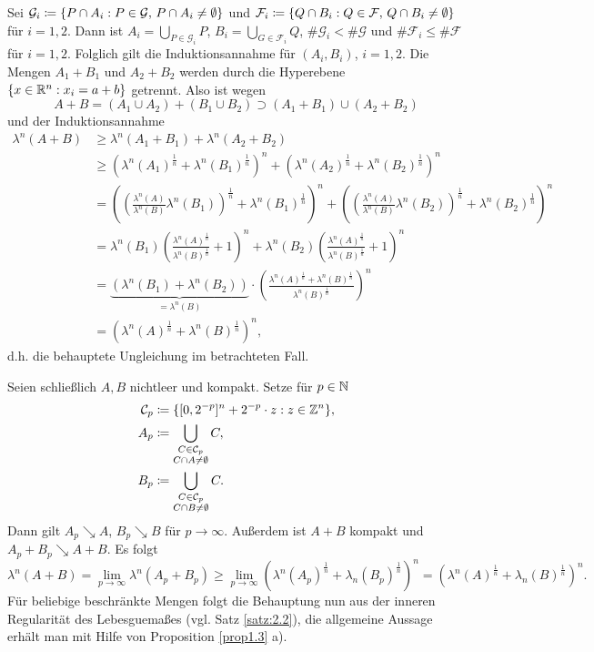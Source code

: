 \documentclass[a4paper,twoside,DIV15,BCOR12mm]{scrbook}
\newcommand{\downto}{\mathrel\searrow}
\begin{document}
\begin{beweis}
Sei $\mathcal G_i \da \{P \cap A_i: P\in\mathcal G,\, P\cap A_i\ne \emptyset\}$ und $\mathcal F_i \da \{Q \cap B_i: Q\in\mathcal F,\, Q\cap B_i\ne \emptyset\}$ für $i=1,2$. Dann ist $A_i = \bigcup_{P\in \mathcal G_i}P$, $B_i = \bigcup_{G\in \mathcal F_i}Q$, $\#\mathcal G_i < \#\mathcal G$ und $\#\mathcal F_i \le \#\mathcal F$ für $i=1,2$. Folglich gilt die Induktionsannahme für $(A_i,B_i)$, $i=1,2$. Die Mengen $A_1 + B_1$ und $A_2+B_2$ werden durch die Hyperebene $\{x\in\mathbb{R}^n: x_i = a+b\}$ getrennt. Also ist wegen
\[
A+B = (A_1\cup A_2) + (B_1\cup B_2) \supset (A_1 + B_1) \cup (A_2 + B_2)
\]
und der Induktionsannahme
\begin{align*}
\lambda^n(A+B)
&\ge \lambda^n(A_1+B_1) + \lambda^n(A_2+B_2) \\
&\ge \left(\lambda^n(A_1)^{\frac 1n} + \lambda^n(B_1)^{\frac 1n}\right)^n + \left(\lambda^n(A_2)^{\frac 1n} + \lambda^n(B_2)^{\frac 1n}\right)^n \\
&= \left(\left(\frac{\lambda^n(A)}{\lambda^n(B)}\lambda^n(B_1)\right)^{\frac 1n} + \lambda^n(B_1)^{\frac 1n}\right)^n + \left(\left(\frac{\lambda^n(A)}{\lambda^n(B)}\lambda^n(B_2)\right)^{\frac 1n} + \lambda^n(B_2)^{\frac 1n}\right)^n\\
&= \lambda^n(B_1)\left( \frac{\lambda^n(A)^{\frac 1n}}{\lambda^n(B)^{\frac 1n}} + 1 \right)^n +\lambda^n(B_2)\left( \frac{\lambda^n(A)^{\frac 1n}}{\lambda^n(B)^{\frac 1n}} + 1 \right)^n\\
&= \underbrace{(\lambda^n(B_1) + \lambda^n(B_2))}_{=\lambda^n(B)} \cdot \left( \frac{\lambda^n(A)^{\frac 1n} + \lambda^n(B)^{\frac 1n}}{\lambda^n(B)^{\frac 1n}}\right)^n \\
&= \left( \lambda^n(A)^{\frac1n} + \lambda^n(B)^{\frac1n} \right)^n,
\end{align*}
d.h. die behauptete Ungleichung im betrachteten Fall.

Seien schließlich $A,B$ nichtleer und kompakt. Setze für $p\in\mathbb{N}$
\begin{align*}
\mathcal C_p &\da \{[0,2^{-p}]^n + 2^{-p}\cdot z : z\in\MdZ^n\}, \\
A_p &\da \bigcup_{\substack{C\in\mathcal C_p \\ C\cap A \ne \emptyset}} C, \\
B_p &\da \bigcup_{\substack{C\in\mathcal C_p \\ C\cap B \ne \emptyset}} C.
\end{align*}
Dann gilt $A_p \downto A$, $B_p \downto B$ für $p\to\infty$. Außerdem ist $A+B$ kompakt und $A_p + B_p \downto A+ B$. Es folgt
\[
\lambda^n(A+B) = \lim_{p\to\infty} \lambda^n(A_p + B_p) 
\ge \lim_{p\to\infty} \left( \lambda^n(A_p)^{\frac 1n} + \lambda_n(B_p)^{\frac1n} \right)^n
=  \left( \lambda^n(A)^{\frac 1n} + \lambda_n(B)^{\frac1n} \right)^n.
\]
Für beliebige beschränkte Mengen folgt die Behauptung nun aus der inneren Regularität 
des Lebesguemaßes (vgl. Satz \ref{satz:2.2}), die allgemeine Aussage erhält man 
mit Hilfe von Proposition \ref{prop1.3} a).
\end{beweis}
\end{document}
